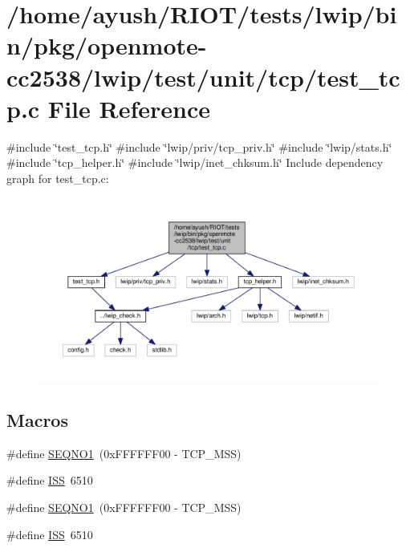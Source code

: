 \hypertarget{openmote-cc2538_2lwip_2test_2unit_2tcp_2test__tcp_8c}{}\section{/home/ayush/\+R\+I\+O\+T/tests/lwip/bin/pkg/openmote-\/cc2538/lwip/test/unit/tcp/test\+\_\+tcp.c File Reference}
\label{openmote-cc2538_2lwip_2test_2unit_2tcp_2test__tcp_8c}
{\ttfamily \#include \char`\"{}test\+\_\+tcp.\+h\char`\"{}}\newline
{\ttfamily \#include \char`\"{}lwip/priv/tcp\+\_\+priv.\+h\char`\"{}}\newline
{\ttfamily \#include \char`\"{}lwip/stats.\+h\char`\"{}}\newline
{\ttfamily \#include \char`\"{}tcp\+\_\+helper.\+h\char`\"{}}\newline
{\ttfamily \#include \char`\"{}lwip/inet\+\_\+chksum.\+h\char`\"{}}\newline
Include dependency graph for test\+\_\+tcp.\+c\+:
\nopagebreak
\begin{figure}[H]
\begin{center}
\leavevmode
\includegraphics[width=350pt]{openmote-cc2538_2lwip_2test_2unit_2tcp_2test__tcp_8c__incl}
\end{center}
\end{figure}
\subsection*{Macros}
\begin{DoxyCompactItemize}
\item 
\#define \hyperlink{openmote-cc2538_2lwip_2test_2unit_2tcp_2test__tcp_8c_a6275f6cfaa9dfa1d388208198681bc62}{S\+E\+Q\+N\+O1}~(0x\+F\+F\+F\+F\+F\+F00 -\/ T\+C\+P\+\_\+\+M\+S\+S)
\item 
\#define \hyperlink{openmote-cc2538_2lwip_2test_2unit_2tcp_2test__tcp_8c_a98592be2a323e1f460af8a99a09642a9}{I\+SS}~6510
\item 
\#define \hyperlink{openmote-cc2538_2lwip_2test_2unit_2tcp_2test__tcp_8c_a6275f6cfaa9dfa1d388208198681bc62}{S\+E\+Q\+N\+O1}~(0x\+F\+F\+F\+F\+F\+F00 -\/ T\+C\+P\+\_\+\+M\+S\+S)
\item 
\#define \hyperlink{openmote-cc2538_2lwip_2test_2unit_2tcp_2test__tcp_8c_a98592be2a323e1f460af8a99a09642a9}{I\+SS}~6510
\end{DoxyCompactItemize}
